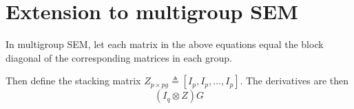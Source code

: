 \documentclass[a4paper, 11pt]{article}
\newcommand{\definedas}{\triangleq}
\newcommand{\kronprod}{\otimes}
\newcommand{\0}{\boldsymbol{0}}
\begin{document}
\section{Extension to multigroup SEM}

In multigroup SEM, let each matrix in the above equations equal the block
diagonal of the corresponding matrices in each group. 

Then define the stacking matrix $Z_{p \times pg} \definedas \left[I_p, I_p,
..., I_p\right]$. The derivatives are then 
$$
	(I_q \kronprod Z) G
$$
\end{document}
